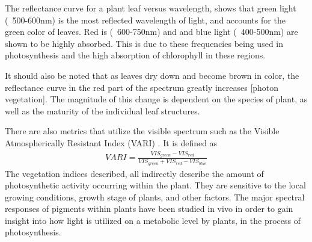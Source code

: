 
The reflectance curve for a plant leaf versus wavelength, shows that green light (~500-600nm) is the most reflected wavelength of light, and accounts for the green color of leaves. Red is (~600-750nm) and and blue light (~400-500nm) are shown to be highly absorbed.  This is due to these frequencies being used in photosynthesis and the high absorption of chlorophyll in these regions.

It should also be noted that as leaves dry down and become brown in color, the reflectance curve in the red part of the spectrum greatly increases [photon vegetation].  The magnitude of this change is dependent on the species of plant, as well as the maturity of the individual leaf structures.

There are also metrics that utilize the visible spectrum such as the Visible Atmospherically Resistant Index (VARI) \cite{harris}.  It is defined as
%
\begin{align}
    VARI = \frac{VIS_{green} - VIS_{red}}{VIS_{green} + VIS_{red}-VIS_{blue}}
\end{align}
%
The vegetation indices described, all indirectly describe the amount of photosynthetic activity occurring within the plant.  They are sensitive to the local growing conditions, growth stage of plants, and other factors. The major spectral responses of pigments within plants have been studied in vivo in order to gain insight into how light is utilized on a metabolic level by plants, in the process of photosynthesis.
